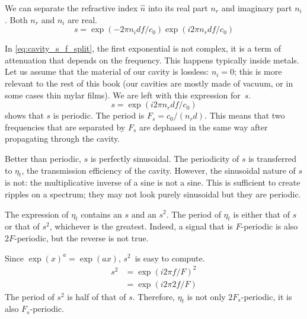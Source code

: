 We can separate the refractive index $\hat{n}$ into its real part $n_r$ and imaginary part $n_i$.
Both $n_r$ and $n_i$ are real.
\begin{equation}
    s =
    \exp \left( -2\pi n_i df/c_0 \right)
    \exp \left( i 2\pi n_r df/c_0 \right)
    \label{eq:cavity_s_f_split}
\end{equation}

In \cref{eq:cavity_s_f_split}, the first exponential is not complex, it is a term of attenuation that depends on the frequency.
This happens typically inside metals.
Let us assume that the material of our cavity is lossless: $n_i=0$; this is
more relevant to the rest of this book (our cavities are mostly made of vacuum, or in some cases thin mylar films).
We are left with this expression for~$s$.
\begin{equation}
    s = \exp \left( i 2\pi n_r df/c_0 \right) \label{eq:cavity_s_f_real}
\end{equation}
 shows that $s$ is periodic.
The period is $F_s = c_0/(n_r d)$.
This means that two frequencies that are separated by $F_s$ are dephased in the same way after propagating through the cavity.

Better than periodic, $s$ is perfectly sinusoidal.
The periodicity of $s$ is transferred to $\eta_t$, the transmission efficiency of the cavity.
However, the sinusoidal nature of $s$ is not: the multiplicative inverse of a sine is not a sine.
This is sufficient to create ripples on a spectrum; they may not look purely sinusoidal but they are periodic.

The expression of $\eta_t$ contains an $s$ and an $s^2$.
The period of $\eta_t$ is either that of $s$ or that of $s^2$,
whichever is the greatest.
Indeed, a signal that is $F$-periodic is also $2F$-periodic, but the reverse is not true.

Since $\exp(x)^a = \exp(ax)$, $s^2$~is easy to compute.
\begin{align*}
    s^2 &= \exp\left(i 2\pi f/F \right)^2 \\
        &= \exp\left(i 2\pi 2f/F \right)
\end{align*}
The period of $s^2$ is half of that of $s$.
Therefore, $\eta_t$ is not only $2F_s$-periodic, it is also $F_s$-periodic.




